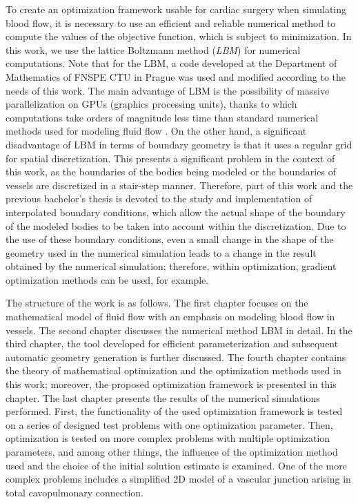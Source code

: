 To create an optimization framework usable for cardiac surgery when simulating blood flow, it is necessary to use an efficient and reliable numerical method to compute the values of the objective function, which is subject to minimization. In this work, we use the lattice Boltzmann method (\textit{LBM}) for numerical computations. Note that for the LBM, a code developed at the Department of Mathematics of FNSPE CTU in Prague was used and modified according to the needs of this work. The main advantage of LBM is the possibility of massive parallelization on GPUs (graphics processing units), thanks to which computations take orders of magnitude less time than standard numerical methods used for modeling fluid flow \cite{PE, Kruger}. On the other hand, a significant disadvantage of LBM in terms of boundary geometry is that it uses a regular grid for spatial discretization. This presents a significant problem in the context of this work, as the boundaries of the bodies being modeled or the boundaries of vessels are discretized in a stair-step manner. Therefore, part of this work and the previous bachelor's thesis \cite{JB} is devoted to the study and implementation of interpolated boundary conditions, which allow the actual shape of the boundary of the modeled bodies to be taken into account within the discretization. Due to the use of these boundary conditions, even a small change in the shape of the geometry used in the numerical simulation leads to a change in the result obtained by the numerical simulation; therefore, within optimization, gradient optimization methods can be used, for example.

The structure of the work is as follows. The first chapter focuses on the mathematical model of fluid flow with an emphasis on modeling blood flow in vessels. The second chapter discusses the numerical method LBM in detail. In the third chapter, the tool developed for efficient parameterization and subsequent automatic geometry generation is further discussed. The fourth chapter contains the theory of mathematical optimization and the optimization methods used in this work; moreover, the proposed optimization framework is presented in this chapter. The last chapter presents the results of the numerical simulations performed. First, the functionality of the used optimization framework is tested on a series of designed test problems with one optimization parameter. Then, optimization is tested on more complex problems with multiple optimization parameters, and among other things, the influence of the optimization method used and the choice of the initial solution estimate is examined. One of the more complex problems includes a simplified 2D model of a vascular junction arising in total cavopulmonary connection.



